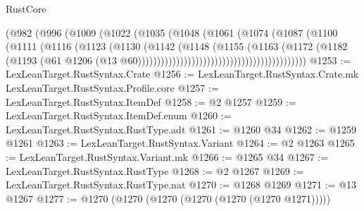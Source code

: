 \begin{lexlean}{RustCore}
\begin{coremodule}
                                              (@982
                                                (@996
                                                  (@1009
                                                    (@1022
                                                      (@1035
                                                        (@1048
                                                          (@1061
                                                            (@1074
                                                              (@1087
                                                                (@1100
                                                                  (@1111
                                                                    (@1116
                                                                      (@1123
                                                                        (@1130
                                                                          (@1142
                                                                            (@1148
                                                                              (@1155
                                                                                (@1163
                                                                                  (@1172
                                                                                    (@1182
                                                                                      (@1193
                                                                                        (@61
                                                                                          @1206
                                                                                          (@13
                                                                                            @60))))))))))))))))))))))))))))))))))))))))))))
@1253 := LexLeanTarget.RustSyntax.Crate
@1256 := LexLeanTarget.RustSyntax.Crate.mk LexLeanTarget.RustSyntax.Profile.core
@1257 := LexLeanTarget.RustSyntax.ItemDef
@1258 := @2 @1257
@1259 := LexLeanTarget.RustSyntax.ItemDef.enum
@1260 := LexLeanTarget.RustSyntax.RustType.adt
@1261 := @1260 @34
@1262 := @1259 @1261
@1263 := LexLeanTarget.RustSyntax.Variant
@1264 := @2 @1263
@1265 := LexLeanTarget.RustSyntax.Variant.mk
@1266 := @1265 @34
@1267 := LexLeanTarget.RustSyntax.RustType
@1268 := @2 @1267
@1269 := LexLeanTarget.RustSyntax.RustType.nat
@1270 := @1268 @1269
@1271 := @13 @1267
@1277 := @1270 (@1270 (@1270 (@1270 (@1270 (@1270 @1271)))))

\end{coremodule}
\end{lexlean}

